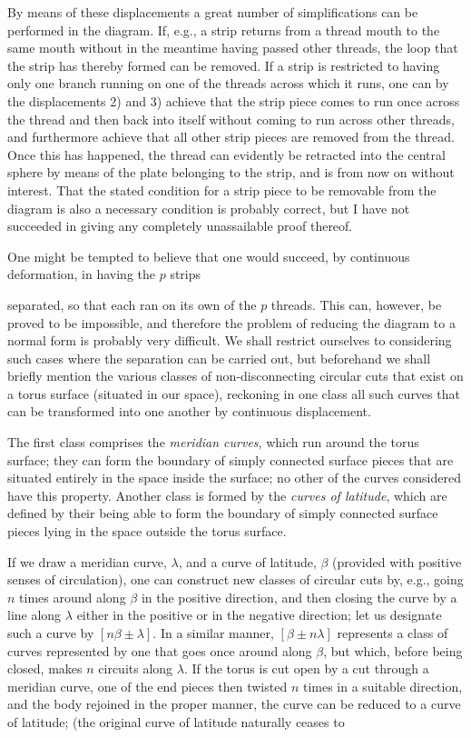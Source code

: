 \documentclass{article}
\begin{document}
By means of these displacements a great number of simplifications can be performed in the diagram. If, e.g., a strip returns from a thread mouth to the same mouth without in the meantime having passed other threads, the loop that the strip has thereby formed can be removed. If a strip is restricted to having only one branch running on one of the threads across which it runs, one can by the displacements 2) and 3) achieve that the strip piece comes to run once across the thread and then back into itself without coming to run across other threads, and furthermore achieve that all other strip pieces are removed from the thread. Once this has happened, the thread can evidently be retracted into the central sphere by means of the plate belonging to the strip, and is from now on without interest. That the stated condition for a strip piece to be removable from the diagram is also a necessary condition is probably correct, but I have not succeeded in giving any completely unassailable proof thereof.

One might be tempted to believe that one would succeed, by continuous deformation, in having the $p$ strips

separated, so that each ran on its own of the $p$ threads. This can, however, be proved to be impossible, and therefore the problem of reducing the diagram to a normal form is probably very difficult. We shall restrict ourselves to considering such cases where the separation can be carried out, but beforehand we shall briefly mention the various classes of non-disconnecting circular cuts that exist on a torus surface (situated in our space), reckoning in one class all such curves that can be transformed into one another by continuous displacement.

The first class comprises the \emph{meridian curves}, which run around the torus surface; they can form the boundary of simply connected surface pieces that are situated entirely in the space inside the surface; no other of the curves considered have this property. Another class is formed by the \emph{curves of latitude}, which are defined by their being able to form the boundary of simply connected surface pieces lying in the space outside the torus surface.

If we draw a meridian curve, $\lambda$, and a curve of latitude, $\beta$ (provided with positive senses of circulation), one can construct new classes of circular cuts by, e.g., going $n$ times around along $\beta$ in the positive direction, and then closing the curve by a line along $\lambda$ either in the positive or in the negative direction; let us designate such a curve by $[n\beta \pm \lambda]$. In a similar manner, $[\beta \pm n\lambda]$ represents a class of curves represented by one that goes once around along $\beta$, but which, before being closed, makes $n$ circuits along $\lambda$. If the torus is cut open by a cut through a meridian curve, one of the end pieces then twisted $n$ times in a suitable direction, and the body rejoined in the proper manner, the curve can be reduced to a curve of latitude; (the original curve of latitude naturally ceases to
\end{document}
